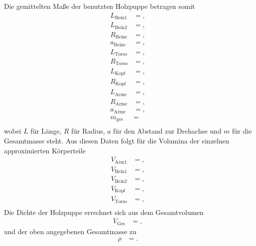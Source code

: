 Die gemittelten Maße der benutzten Holzpuppe betragen somit
\begin{align*}
  L_{\text{Bein1}}  &= , \\
  L_{\text{Bein2}}  &= , \\
  R_{\text{Beine}}   &= , \\
  a_{\text{Beine}}   &= , \\
  L_{\text{Torso}}   &= , \\
  R_{\text{Torso}}   &= , \\
  L_{\text{Kopf}}    &= , \\
  R_{\text{Kopf}}    &= , \\
  L_{\text{Arme}}    &= , \\
  R_{\text{Arme}}    &= , \\
  a_{\text{Arme}}    &= , \\
  m_{\text{ges}}     &=  \\
\end{align*}
wobei $L$ für Länge, $R$ für Radius, $a$ für den Abstand zur Drehachse und $m$ für die Gesamtmasse steht.
Aus diesen Daten folgt für die Volumina der einzelnen approximierten Körperteile
\begin{align*}
  V_{\text{Arm1}}  &= , \\
  V_{\text{Bein1}}  &= , \\
  V_{\text{Bein2}}  &= , \\
  V_{\text{Kopf}}  &= , \\
  V_{\text{Torso}}  &= , \\
\end{align*}
Die Dichte der Holzpuppe errechnet sich aus dem Gesamtvolumen
\begin{align*}
  V_\text{Ges} &= ,
\end{align*}
und der oben angegebenen Gesamtmasse zu
\begin{align*}
  \rho &= .
\end{align*}
